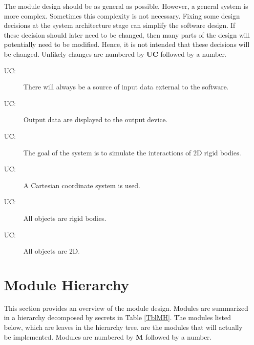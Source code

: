 \documentclass[12pt]{article}
\newcounter{ucnum}
\newcommand{\uctheucnum}{UC\theucnum}
\newcommand{\authornote}[3]{}
\newcommand{\olu}[1]{\authornote{red}{OO}{#1}}
\begin{document}
The module design should be as general as possible. However, a general system is
more complex. Sometimes this complexity is not necessary. Fixing some design
decisions at the system architecture stage can simplify the software design. If
these decision should later need to be changed, then many parts of the design
will potentially need to be modified. Hence, it is not intended that these
decisions will be changed.  Unlikely changes are numbered by \textbf{UC}
followed by a number.

\begin{description}
\item[ \uctheucnum \label{ucInput}:] There will always be a source of input data external to the software.
\item[ \uctheucnum \label{ucOutput}:] Output data are
  displayed to the output device.
\item[ \uctheucnum \label{ucGoal}:] The goal of the system is to simulate the interactions of 2D rigid bodies.
\item[ \uctheucnum \label{ucCartesian}:] A Cartesian 
coordinate system is used.
\item[ \uctheucnum \label{ucRigid}:] All objects
are rigid bodies.
\item[ \uctheucnum \label{uc2D}:] All objects
are 2D.
\end{description}

\section{Module Hierarchy} \label{SecMH}

This section provides an overview of the module design. Modules are summarized
in a hierarchy decomposed by secrets in Table \ref{TblMH}. The modules listed
below, which are leaves in the hierarchy tree, are the modules that will
actually be implemented.  Modules are numbered by \textbf{M}
followed by a number.
\end{document}
